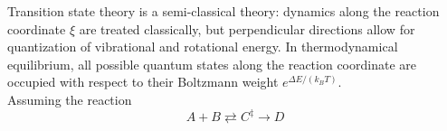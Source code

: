 \documentclass[11pt,DIV=13,BCOR=5mm,a4paper,headinclude]{scrbook}
\begin{document}
Transition state theory is a semi-classical theory: dynamics along the reaction coordinate $\xi$ are treated classically, but perpendicular directions allow for quantization of vibrational and rotational energy.
In thermodynamical equilibrium, all possible quantum states along the reaction coordinate are occupied  with respect to their Boltzmann weight $e^{\Delta E/(k_BT)}$.
\\
Assuming the reaction
\begin{equation}
A+ B \rightleftarrows C^\ddagger \rightarrow D
\end{equation}
\end{document}
